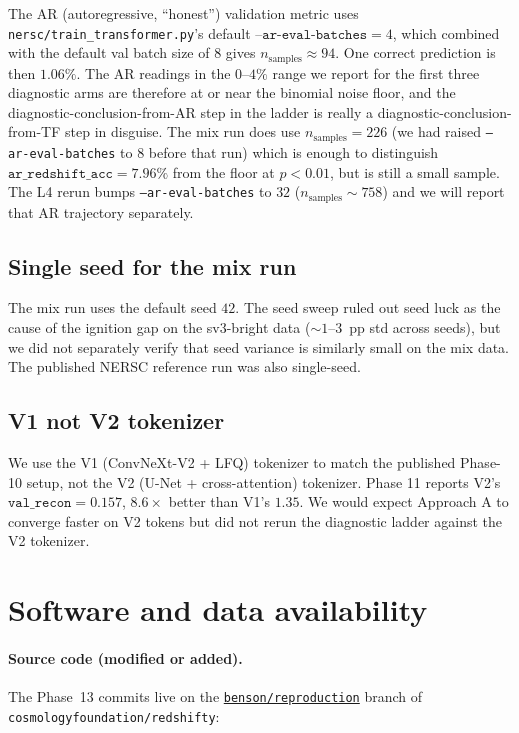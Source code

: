 \documentclass[11pt,letterpaper]{article}
\newcommand{\arz}{\texttt{ar\_redshift\_acc}}
\begin{document}
The AR (autoregressive, ``honest'') validation metric uses
\texttt{nersc/train\_transformer.py}'s default
$\texttt{--ar-eval-batches}{=}4$, which combined with the default
val batch size of $8$ gives $n_{\mathrm{samples}} \approx 94$. One
correct prediction is then $1.06\%$. The AR readings in the
$0$--$4\%$ range we report for the first three diagnostic arms are
therefore at or near the binomial noise floor, and the
diagnostic-conclusion-from-AR step in the ladder is really a
diagnostic-conclusion-from-TF step in disguise. The mix run does
use $n_{\mathrm{samples}} = 226$ (we had raised \texttt{--ar-eval-batches}
to $8$ before that run) which is enough to distinguish $\arz = 7.96\%$
from the floor at $p < 0.01$, but is still a small sample. The L4
rerun bumps \texttt{--ar-eval-batches} to $32$
($n_{\mathrm{samples}} \sim 758$) and we will report that AR
trajectory separately.

\subsection{Single seed for the mix run}

The mix run uses the default seed $42$. The seed sweep ruled out
seed luck as the cause of the ignition gap on the sv3-bright data
($\sim$$1$--$3$~pp std across seeds), but we did not separately verify
that seed variance is similarly small on the mix data. The published
NERSC reference run was also single-seed.

\subsection{V1 not V2 tokenizer}

We use the V1 (ConvNeXt-V2 + LFQ) tokenizer to match the published
Phase-10 setup, not the V2 (U-Net + cross-attention) tokenizer.
\citet{samuel2026redshifty} Phase 11 reports V2's
$\texttt{val\_recon} = 0.157$, $8.6{\times}$ better than V1's $1.35$.
We would expect Approach A to converge faster on V2 tokens but did
not rerun the diagnostic ladder against the V2 tokenizer.

\section{Software and data availability}

\paragraph{Source code (modified or added).} The Phase~13 commits live
on the
\texttt{\href{https://github.com/cosmologyfoundation/redshifty/pull/1}{benson/reproduction}}
branch of \texttt{cosmologyfoundation/redshifty}:
\end{document}
